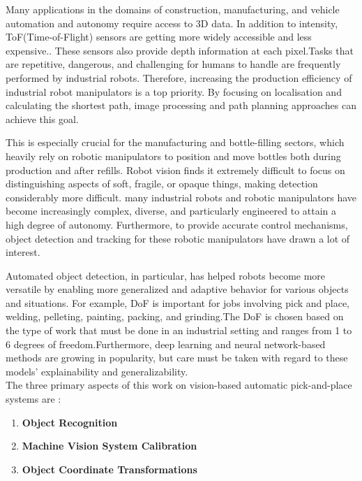 \documentclass[12pt]{article}
\begin{document}
Many applications in the domains of construction, manufacturing, and vehicle automation and autonomy require access to 3D data. In addition to intensity, ToF(Time-of-Flight) sensors are getting more widely accessible and less expensive.. These sensors also provide depth information at each pixel.Tasks that are repetitive, dangerous, and challenging for humans to handle are frequently performed by industrial robots. Therefore, increasing the production efficiency of industrial robot manipulators is a top priority. By focusing on localisation and calculating the shortest path, image processing and path planning approaches can achieve this goal.  

This is especially crucial for the manufacturing and bottle-filling sectors, which heavily rely on robotic manipulators to position and move bottles both during production and after refills. Robot vision finds it extremely difficult to focus on distinguishing aspects of soft, fragile, or opaque things, making detection considerably more difficult. many industrial robots and robotic manipulators have become increasingly complex, diverse, and particularly engineered to attain a high degree of autonomy. Furthermore, to provide accurate control mechanisms, object detection and tracking for these robotic manipulators have drawn a lot of interest\cite{ref2, ref12}.

Automated object detection, in particular, has helped robots become more versatile by enabling more generalized and adaptive behavior for various objects and situations. For example, DoF is important for jobs involving pick and place, welding, pelleting, painting, packing, and grinding.The DoF is chosen based on the type of work that must be done in an industrial setting and ranges from 1 to 6 degrees of freedom.Furthermore, deep learning and neural network-based methods are growing in popularity, but care must be taken with regard to these models' explainability and generalizability\cite{ref12}.\\


The three primary aspects of this work on vision-based automatic pick-and-place systems are \cite{ref12}:
\begin{enumerate}
  \item \textbf{Object Recognition}
  \item \textbf{Machine Vision System Calibration}
  \item \textbf{Object Coordinate Transformations}
\end{enumerate}
\end{document}
